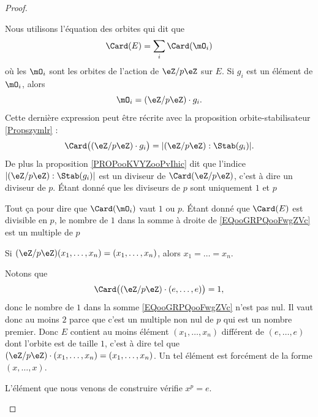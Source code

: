 \begin{proof}
\begin{subproof}
		Nous utilisons l'équation des orbites qui dit que
		\begin{equation}		\label{EQooGRPQooFwgZVc}
			\Card(E)=\sum_i\Card(\mO_i)
		\end{equation}
		où les \( \mO_i\) sont les orbites de l'action de \( \eZ/p\eZ\) sur \( E\). Si \( g_i\) est un élément de \( \mO_i\), alors
		\begin{equation}
			\mO_i=(\eZ/p\eZ)\cdot g_i.
		\end{equation}
		Cette dernière expression peut être récrite avec la proposition orbite-stabilisateur \ref{Propszymlr} :
		\begin{equation}
			\Card\big( (\eZ/p\eZ)\cdot g_i \big)=| (\eZ/p\eZ):\Stab(g_i) |.
		\end{equation}
		De plus la proposition \ref{PROPooKVYZooPvIhic} dit que l'indice \( | (\eZ/p\eZ):\Stab(g_i) | \) est un diviseur de \( \Card(\eZ/p\eZ)\), c'est à dire un diviseur de \( p\). Étant donné que les diviseurs de \( p \) sont uniquement \( 1\) et \( p\)

		Tout ça pour dire que \( \Card(\mO_i)\) vaut \( 1\) ou \( p\). Étant donné que \( \Card(E)\) est divisible en \( p\), le nombre de \( 1\) dans la somme à droite de \eqref{EQooGRPQooFwgZVc} est un multiple de \( p\)

		\spitem[Si \( \Card(\mO_i)=1\)]
		Si \( (\eZ/p\eZ)(x_1,\ldots,x_n)=(x_1,\ldots,x_n)\), alors \( x_1=\ldots =x_n\).

		Notons que
		\begin{equation}
			\Card\big( (\eZ/p\eZ)\cdot (e,\ldots,e) \big)=1,
		\end{equation}
		donc le nombre de \( 1\) dans la somme \eqref{EQooGRPQooFwgZVc} n'est pas nul. Il vaut donc au moins \( 2\) parce que c'est un multiple non nul de \( p\) qui est un nombre premier. Donc \( E\) contient au moins élément \( (x_1,\ldots,x_n)\) différent de \( (e,\ldots,e)\) dont l'orbite est de taille \( 1\), c'est à dire tel que \( (\eZ/p\eZ )\cdot (x_1,\ldots,x_n)=(x_1,\ldots,x_n)\). Un tel élément est forcément de la forme \( (x,\ldots,x)\).

		\spitem[Conclusion]
		L'élément que nous venons de construire vérifie \( x^p=e\).

	\end{subproof}
\end{proof}



